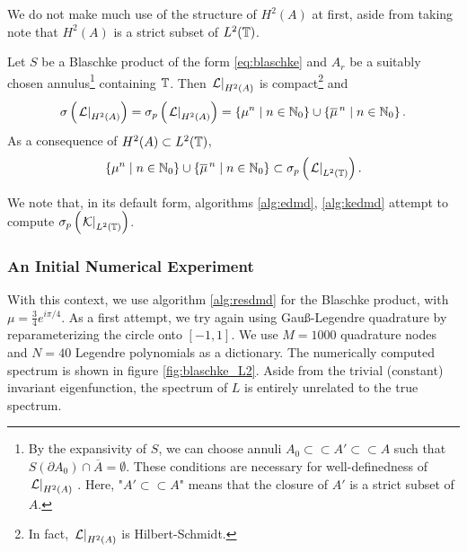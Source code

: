 We do not make much use of the structure of $H^2 (A)$ at first, aside from taking note that 
$H^2 (A)$ is a strict subset of $L^2 (\mathbb{T})$. 
\begin{proposition}
    Let $S$ be a Blaschke product of the form \ref{eq:blaschke} and $A_r$ be a suitably 
    chosen annulus\footnote{
        By the expansivity of $S$, we can choose annuli 
        $A_0 \subset\subset A' \subset\subset A$ such that 
        $S (\partial A_0) \cap \overline{A} = \emptyset$. These conditions are necessary 
        for well-definedness of $\left. \mathcal{L} \right|_{H^2(A)}$ \cite{Slipantschuk2}. 
        Here, "$A' \subset\subset A$" means that the closure of $A'$ is a strict subset of $A$. 
    } containing $\mathbb{T}$. Then $\left. \mathcal{L} \right|_{H^2(A)}$ is compact\footnote{
        In fact, $\left. \mathcal{L} \right|_{H^2(A)}$ is Hilbert-Schmidt. 
    } and
    \begin{equation}
        \sigma \left( \left. \mathcal{L} \right|_{H^2(A)} \right) 
        = \sigma_p \left( \left. \mathcal{L} \right|_{H^2(A)} \right)
        = \left\{ \mu^n \mid n \in \mathbb{N}_0 \right\} \cup \left\{ \overline{\mu}^{\,n} \mid n \in \mathbb{N}_0 \right\} . 
    \end{equation}
    As a consequence of $H^2 (A) \subset L^2 (\mathbb{T})$, 
    \begin{equation}
        \left\{ \mu^n \mid n \in \mathbb{N}_0 \right\} \cup \left\{ \overline{\mu}^{\,n} \mid n \in \mathbb{N}_0 \right\} 
        \subset \sigma_p \left( \left. \mathcal{L} \right|_{L^2(\mathbb{T})} \right) . 
    \end{equation}
\end{proposition}

We note that, in its default form, algorithms \ref{alg:edmd}, \ref{alg:kedmd} 
attempt to compute $\sigma_p \left( \left. \mathcal{K} \right|_{L^2(\mathbb{T})} \right)$. 

\subsubsection{An Initial Numerical Experiment}\label{sec:blaschke_L2}

With this context, we use algorithm \ref{alg:resdmd} for the Blaschke product, with 
$\mu = \frac{3}{4} e^{i \pi / 4}$. As a first attempt, we try again using Gauß-Legendre 
quadrature by reparameterizing the circle onto $[-1, 1]$. We use $M = 1000$ quadrature 
nodes and $N = 40$ Legendre polynomials as a dictionary. The numerically computed spectrum 
is shown in figure \ref{fig:blaschke_L2}. Aside from the trivial (constant) invariant 
eigenfunction, the spectrum of $L$ is entirely unrelated to the true spectrum. 

